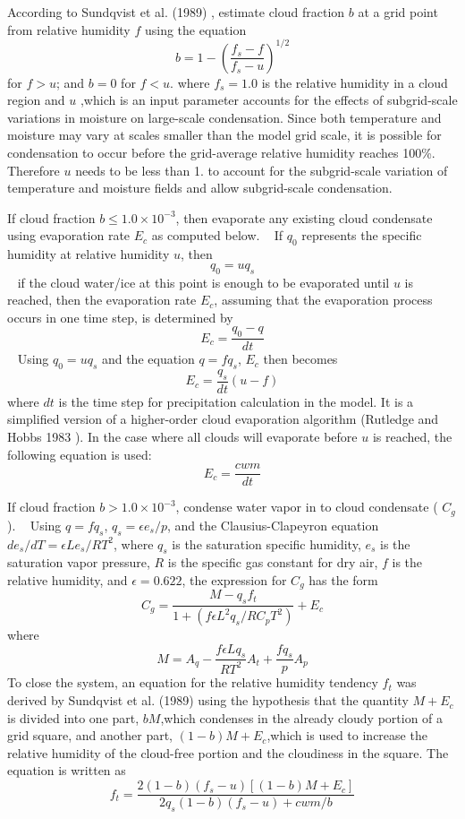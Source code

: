 \begin{DoxyEnumerate}
\begin{DoxyItemize}
\item According to Sundqvist et al. (1989) \cite{sundqvist_et_al_1989}, estimate cloud fraction $b$ at a grid point from relative humidity $f$ using the equation \[ b=1-\left ( \frac{f_{s}-f}{f_{s}-u} \right )^{1/2} \] for $f>u$; and $b=0$ for $f<u$. where $f_{s}=1.0$ is the relative humidity in a cloud region and $u$ ,which is an input parameter accounts for the effects of subgrid-\/scale variations in moisture on large-\/scale condensation. Since both temperature and moisture may vary at scales smaller than the model grid scale, it is possible for condensation to occur before the grid-\/average relative humidity reaches 100\%. Therefore $u$ needs to be less than 1. to account for the subgrid-\/scale variation of temperature and moisture fields and allow subgrid-\/scale condensation.
\item If cloud fraction $b\leq 1.0\times10^{-3}$, then evaporate any existing cloud condensate using evaporation rate $E_{c}$ as computed below. ~\newline
 If $q_{0}$ represents the specific humidity at relative humidity $u$, then \[ q_{0}=uq_{s} \] ~\newline
 if the cloud water/ice at this point is enough to be evaporated until $u$ is reached, then the evaporation rate $E_{c}$, assuming that the evaporation process occurs in one time step, is determined by \[ E_{c}=\frac{q_{0}-q}{dt} \] ~\newline
 Using $q_{0}=uq_{s}$ and the equation $q=fq_{s}$, $E_{c}$ then becomes \[ E_{c}=\frac{q_{s}}{dt}(u-f) \] where $dt$ is the time step for precipitation calculation in the model. It is a simplified version of a higher-\/order cloud evaporation algorithm (Rutledge and Hobbs 1983 \cite{rutledge_and_hobbs_1983}). In the case where all clouds will evaporate before $u$ is reached, the following equation is used\+: \[ E_{c}=\frac{cwm}{dt} \]
\item If cloud fraction $b>1.0\times10^{-3}$, condense water vapor in to cloud condensate ( $C_{g}$). ~\newline
 Using $q=fq_{s}$, $q_{s}=\epsilon e_{s}/p$, and the Clausius-\/\+Clapeyron equation $de_{s}/dT=\epsilon Le_{s}/RT^{2}$, where $q_{s}$ is the saturation specific humidity, $e_{s}$ is the saturation vapor pressure, $R$ is the specific gas constant for dry air, $f$ is the relative humidity, and $\epsilon=0.622$, the expression for $C_{g}$ has the form \[ C_{g}=\frac{M-q_{s}f_{t}}{1+(f\epsilon L^{2}q_{s}/RC_{p}T^{2})}+E_{c} \] where \[ M=A_{q}-\frac{f\epsilon Lq_{s}}{RT^{2}}A_{t}+\frac{fq_{s}}{p}A_{p} \] To close the system, an equation for the relative humidity tendency $f_{t}$ was derived by Sundqvist et al. (1989) \cite{sundqvist_et_al_1989} using the hypothesis that the quantity $M+E_{c}$ is divided into one part, $bM$,which condenses in the already cloudy portion of a grid square, and another part, $(1-b)M+E_{c}$,which is used to increase the relative humidity of the cloud-\/free portion and the cloudiness in the square. The equation is written as \[ f_{t}=\frac{2(1-b)(f_{s}-u)[(1-b)M+E_{c}]}{2q_{s}(1-b)(f_{s}-u)+cwm/b} \]

\end{DoxyItemize}
\end{DoxyEnumerate}

